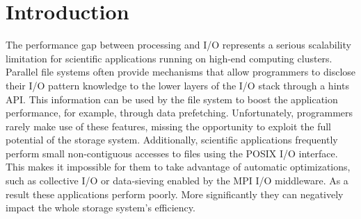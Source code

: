 \documentclass[conference]{IEEEtran}
\begin{document}
\section{Introduction}
\label{sec: intro}
The performance gap between processing and I/O represents a serious scalability limitation for scientific applications running on high-end computing clusters. Parallel file systems often provide mechanisms that allow programmers to disclose their I/O pattern knowledge to the lower layers of the I/O stack through a hints API. This information can be used by the file system to boost the application performance, for example, through data prefetching. Unfortunately, programmers rarely make use of these features, missing the opportunity to exploit the full potential of the storage system. Additionally, scientific applications frequently perform small non-contiguous accesses to files using the POSIX I/O interface. This makes it impossible for them to take advantage of automatic optimizations, such as collective I/O or data-sieving enabled by the MPI I/O middleware. As a result these applications perform poorly. More significantly they can negatively impact the whole storage system's efficiency.

\end{document}
